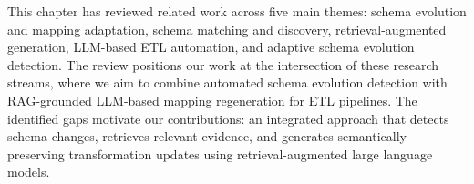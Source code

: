This chapter has reviewed related work across five main themes: schema evolution and mapping adaptation, schema matching and discovery, retrieval-augmented generation, LLM-based ETL automation, and adaptive schema evolution detection. The review positions our work at the intersection of these research streams, where we aim to combine automated schema evolution detection with RAG-grounded LLM-based mapping regeneration for ETL pipelines. The identified gaps motivate our contributions: an integrated approach that detects schema changes, retrieves relevant evidence, and generates semantically preserving transformation updates using retrieval-augmented large language models.


